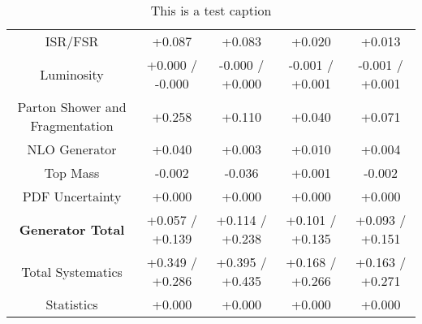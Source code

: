 \begin{table}[htbp]
\begin{center}
\begin{tabular}{|c|c|c|c|c|}
ISR/FSR                               &+0.087              & +0.083              & +0.020              & +0.013             \\
Luminosity                            &+0.000   / -0.000   & -0.000   / +0.000   & -0.001   / +0.001   & -0.001   / +0.001  \\
Parton Shower and Fragmentation       &+0.258              & +0.110              & +0.040              & +0.071             \\
NLO Generator                         &+0.040              & +0.003              & +0.010              & +0.004             \\
Top Mass                              &-0.002              & -0.036              & +0.001              & -0.002             \\
PDF Uncertainty                       &+0.000              & +0.000              & +0.000              & +0.000             \\
\hline
\textbf{Generator Total}              &+0.057   / +0.139   & +0.114   / +0.238   & +0.101   / +0.135   & +0.093   / +0.151  \\
\hline
\hline
Total Systematics                     &+0.349   / +0.286   & +0.395   / +0.435   & +0.168   / +0.266   & +0.163   / +0.271  \\
Statistics                            &+0.000              & +0.000              & +0.000              & +0.000             \\
\hline
  \end{tabular}
  \end{center} 
  \label{tab:fsm_nominal_rratio}
  \caption{This is a test caption}
\end{table}
 

